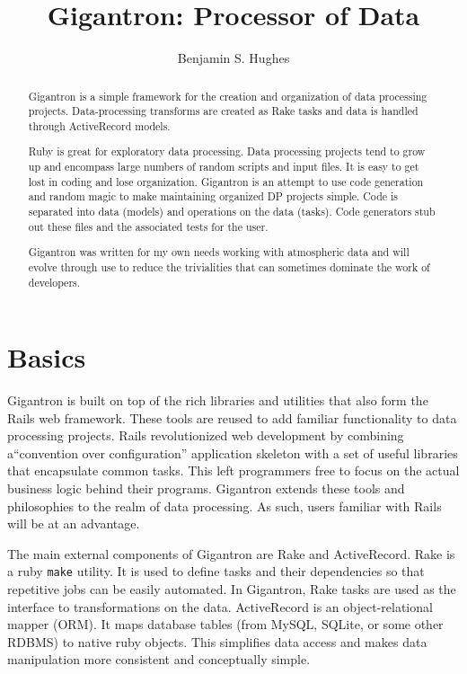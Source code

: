\documentclass[12pt]{article}
\begin{document}
\title{Gigantron: Processor of Data}
\author{Benjamin S. Hughes}
\maketitle

\begin{abstract}
Gigantron is a simple framework for the creation and organization of data processing projects. Data-processing transforms are created as Rake tasks and data is handled through ActiveRecord models.

Ruby is great for exploratory data processing. Data processing projects tend to grow up and encompass large numbers of random scripts and input files. It is easy to get lost in coding and lose organization. Gigantron is an attempt to use code generation and random magic to make maintaining organized DP projects simple. Code is separated into data (models) and operations on the data (tasks). Code generators stub out these files and the associated tests for the user.

Gigantron was written for my own needs working with atmospheric data and will evolve through use to reduce the trivialities that can sometimes dominate the work of developers.
\end{abstract}

\section*{Basics}

Gigantron is built on top of the rich libraries and utilities that also form the Rails web framework.  These tools are reused to add familiar functionality to data processing projects.  Rails revolutionized web development by combining a``convention over configuration'' application skeleton with a set of useful libraries that encapsulate common tasks.  This left programmers free to focus on the actual business logic behind their programs.  Gigantron extends these tools and philosophies to the realm of data processing. As such, users familiar with Rails will be at an advantage.

The main external components of Gigantron are Rake and ActiveRecord.  Rake is a ruby \texttt{make} utility.  It is used to define tasks and their dependencies so that repetitive jobs can be easily automated.  In Gigantron, Rake tasks are used as the interface to transformations on the data.  ActiveRecord is an object-relational mapper (ORM).  It maps database tables (from MySQL, SQLite, or some other RDBMS) to native ruby objects. This simplifies data access and makes data manipulation more consistent and conceptually simple.
\end{document}
